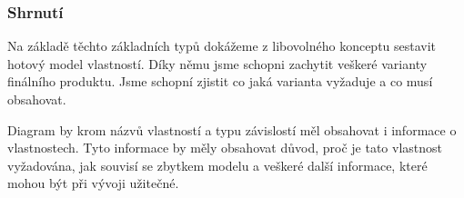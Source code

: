 \subsubsection{Shrnutí}
Na základě těchto základních typů dokážeme z libovolného konceptu sestavit hotový model vlastností. Díky němu jsme schopni zachytit veškeré varianty finálního produktu. Jsme schopní zjistit co jaká varianta vyžaduje a co musí obsahovat. 

Diagram by krom názvů vlastností a typu závislostí měl obsahovat i informace o vlastnostech. Tyto informace by měly obsahovat důvod, proč je tato vlastnost vyžadována, jak souvisí se zbytkem modelu a veškeré další informace, které mohou být při vývoji užitečné. 
